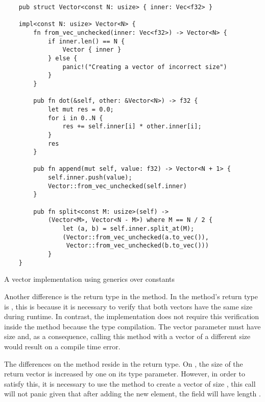 \begin{listing}[H]
    \begin{verbatim}
    pub struct Vector<const N: usize> { inner: Vec<f32> }

    impl<const N: usize> Vector<N> {
        fn from_vec_unchecked(inner: Vec<f32>) -> Vector<N> {
            if inner.len() == N {
                Vector { inner }
            } else {
                panic!("Creating a vector of incorrect size")
            }
        }

        pub fn dot(&self, other: &Vector<N>) -> f32 {
            let mut res = 0.0;
            for i in 0..N {
                res += self.inner[i] * other.inner[i];
            }
            res
        }

        pub fn append(mut self, value: f32) -> Vector<N + 1> {
            self.inner.push(value);
            Vector::from_vec_unchecked(self.inner)
        }

        pub fn split<const M: usize>(self) -> 
            (Vector<M>, Vector<N - M>) where M == N / 2 {
                let (a, b) = self.inner.split_at(M);
                (Vector::from_vec_unchecked(a.to_vec()),
                 Vector::from_vec_unchecked(b.to_vec()))
            }
    }
    \end{verbatim}
    \caption{A vector implementation using generics over constants}
  \label{lst:vector_const_gen}
\end{listing}

Another difference is the return type in the  method. In
 the method's return type is ,
this is because it is necessary to verify that both vectors have the same size
during runtime. In contrast, the  implementation
does not require this verification inside the method because the type
compilation. The vector parameter  must have size  and,
as a consequence, calling this method with a vector of a different size would
result on a compile time error.

The differences on the  method reside in the return type. On
, the size of the return vector is increased by one
on its type parameter. However, in order to satisfy this, it is necessary to
use the  method to create a vector of size , this call will not panic given that after adding the new element, the
 field will have length .

